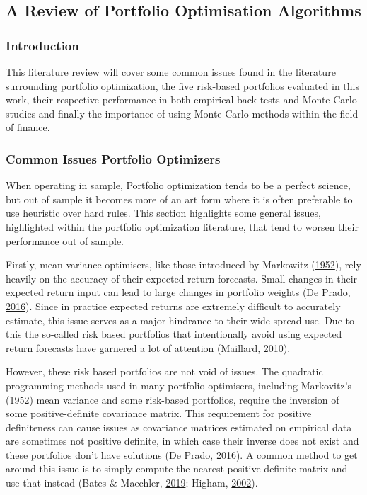 \documentclass[11pt,preprint, authoryear]{elsarticle}
\numberwithin{equation}{section}
\numberwithin{figure}{section}
\numberwithin{table}{section}
\begin{document}
\hypertarget{a-review-of-portfolio-optimisation-algorithms}{%
\subsection{A Review of Portfolio Optimisation
Algorithms}\label{a-review-of-portfolio-optimisation-algorithms}}

\hypertarget{introduction-1}{%
\subsubsection{Introduction}\label{introduction-1}}

This literature review will cover some common issues found in the
literature surrounding portfolio optimization, the five risk-based
portfolios evaluated in this work, their respective performance in both
empirical back tests and Monte Carlo studies and finally the importance
of using Monte Carlo methods within the field of finance.

\hypertarget{common-issues-portfolio-optimizers}{%
\subsubsection{Common Issues Portfolio
Optimizers}\label{common-issues-portfolio-optimizers}}

When operating in sample, Portfolio optimization tends to be a perfect
science, but out of sample it becomes more of an art form where it is
often preferable to use heuristic over hard rules. This section
highlights some general issues, highlighted within the portfolio
optimization literature, that tend to worsen their performance out of
sample.

Firstly, mean-variance optimisers, like those introduced by Markowitz
(\protect\hyperlink{ref-markowitz}{1952}), rely heavily on the accuracy
of their expected return forecasts. Small changes in their expected
return input can lead to large changes in portfolio weights (De Prado,
\protect\hyperlink{ref-lopez}{2016}). Since in practice expected returns
are extremely difficult to accurately estimate, this issue serves as a
major hindrance to their wide spread use. Due to this the so-called risk
based portfolios that intentionally avoid using expected return
forecasts have garnered a lot of attention (Maillard,
\protect\hyperlink{ref-maillard2010}{2010}).

However, these risk based portfolios are not void of issues. The
quadratic programming methods used in many portfolio optimisers,
including Markovitz's (1952) mean variance and some risk-based
portfolios, require the inversion of some positive-definite covariance
matrix. This requirement for positive definiteness can cause issues as
covariance matrices estimated on empirical data are sometimes not
positive definite, in which case their inverse does not exist and these
portfolios don't have solutions (De Prado,
\protect\hyperlink{ref-lopez}{2016}). A common method to get around this
issue is to simply compute the nearest positive definite matrix and use
that instead (Bates \& Maechler, \protect\hyperlink{ref-Matrix}{2019};
Higham, \protect\hyperlink{ref-higham2002}{2002}).
\end{document}
